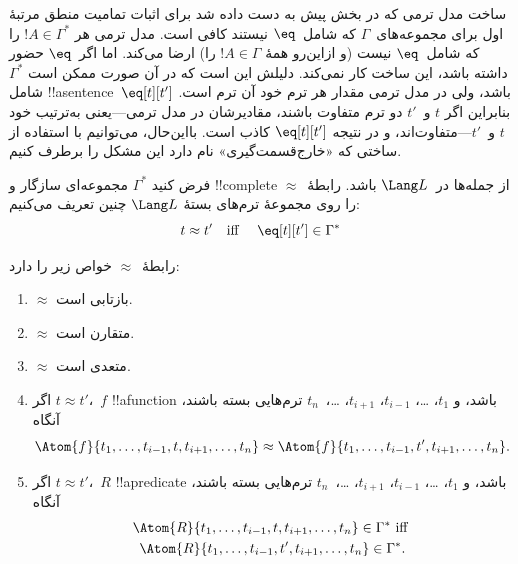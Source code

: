 \documentclass[../../../include/open-logic-section]{subfiles}
\begin{document}

\begin{explain}
ساخت مدل ترمی که در بخش پیش به دست داده شد برای اثبات تمامیت منطق
مرتبهٔ اول برای مجموعه‌های~$\Gamma$ که شامل~$\eq$ نیستند کافی است. مدل
ترمی هر $!A \in \Gamma^*$ را که شامل~$\eq$ نیست (و ازاین‌رو همهٔ
$!A \in \Gamma$ را) ارضا می‌کند. اما اگر~$\eq$ حضور داشته باشد، این
ساخت کار نمی‌کند. دلیلش این است که در آن صورت ممکن است $\Gamma^*$ شامل
!!a{sentence}~$\eq[t][t']$ باشد، ولی در مدل ترمی مقدار هر ترم خود آن ترم
است. بنابراین اگر $t$ و~$t'$ دو ترم متفاوت باشند، مقادیرشان در مدل
ترمی---یعنی به‌ترتیب خود $t$ و~$t'$---متفاوت‌اند، و در نتیجه
$\eq[t][t']$ کاذب است. بااین‌حال، می‌توانیم با استفاده از ساختی که
«خارج‌قسمت‌گیری» نام دارد این مشکل را برطرف کنیم.
\end{explain}

\begin{defn}
  فرض کنید $\Gamma^*$ مجموعه‌ای سازگار و !!{complete} از جمله‌ها
  در~$\Lang L$ باشد. رابطهٔ~$\approx$ را روی مجموعهٔ ترم‌های بستهٔ
  $\Lang L$ چنین تعریف می‌کنیم:
  \[
  t \approx t' \text{\quad iff \quad} \eq[t][t'] \in \Gamma^*
  \]
\end{defn}

\begin{prop}
رابطهٔ~$\approx$ خواص زیر را دارد:
\begin{enumerate}
\item $\approx$ بازتابی است.
\item $\approx$ متقارن است.
\item $\approx$ متعدی است.
\item اگر $t \approx t'$،~$f$ !!a{function} باشد، و $t_1$، \dots،
  $t_{i-1}$، $t_{i+1}$، \dots،~$t_n$ ترم‌هایی بسته باشند، آنگاه
\[
\Atom{f}{t_1,\dots, t_{i-1}, t, t_{i+1}, \dots, t_n} \approx
\Atom{f}{t_1,\dots, t_{i-1}, t', t_{i+1}, \dots, t_n}.
\]
\item اگر $t \approx t'$،~$R$ !!a{predicate} باشد، و $t_1$، \dots،
  $t_{i-1}$، $t_{i+1}$، \dots،~$t_n$ ترم‌هایی بسته باشند، آنگاه
\begin{multline*}
\Atom{R}{t_1,\dots, t_{i-1}, t, t_{i+1}, \dots, t_n} \in \Gamma^* \text{ iff } \\
\Atom{R}{t_1,\dots, t_{i-1}, t', t_{i+1}, \dots, t_n} \in \Gamma^*.
\end{multline*}
\end{enumerate}
\end{prop}
\end{document}
